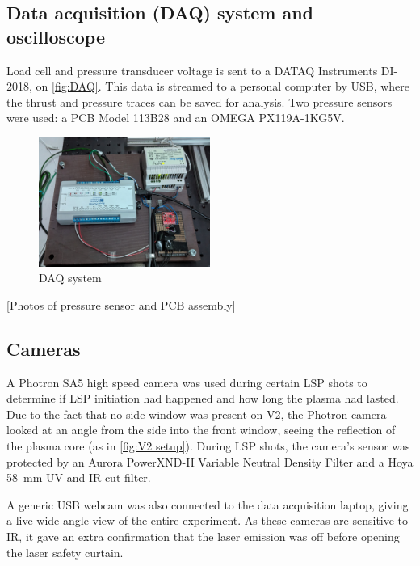         \subsection{Data acquisition (DAQ) system and oscilloscope}

            Load cell and pressure transducer voltage is sent to a DATAQ Instruments DI-2018, on \autoref{fig:DAQ}. This data is streamed to a personal computer by USB, where the thrust and pressure traces can be saved for analysis. Two pressure sensors were used: a PCB Model 113B28 and an OMEGA PX119A-1KG5V.

            \begin{figure}[!ht]
                \centering
                \includegraphics[width=0.50\textwidth]{assets/3 design/DAQ electronics.jpg}
                \caption{DAQ system}
                \label{fig:DAQ}
            \end{figure}

            [Photos of pressure sensor and PCB assembly]

        \subsection{Cameras}

            A Photron SA5 high speed camera was used during certain LSP shots to determine if LSP initiation had happened and how long the plasma had lasted. Due to the fact that no side window was present on V2, the Photron camera looked at an angle from the side into the front window, seeing the reflection of the plasma core (as in \autoref{fig:V2 setup}). During LSP shots, the camera's sensor was protected by an Aurora PowerXND-II Variable Neutral Density Filter and a Hoya \qty{58}{mm} UV and IR cut filter.

            A generic USB webcam was also connected to the data acquisition laptop, giving a live wide-angle view of the entire experiment. As these cameras are sensitive to IR, it gave an extra confirmation that the laser emission was off before opening the laser safety curtain.

